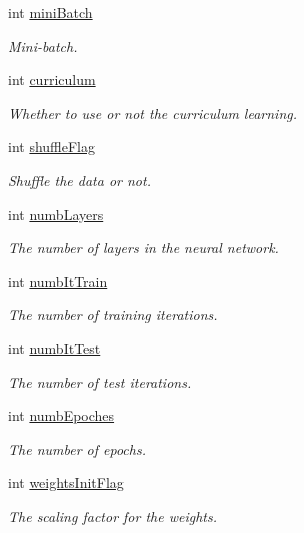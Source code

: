 \begin{DoxyCompactItemize}
int \hyperlink{classParamsInit_a5b75660e32158581daeb48a8b648c19a}{mini\+Batch}
\begin{DoxyCompactList}\small\item\em Mini-\/batch. \end{DoxyCompactList}\item 
int \hyperlink{classParamsInit_a7a7a2071cd2454eef8f2a1a0515cff0c}{curriculum}
\begin{DoxyCompactList}\small\item\em Whether to use or not the curriculum learning. \end{DoxyCompactList}\item 
int \hyperlink{classParamsInit_af816db821e4c8e19d599806617f11176}{shuffle\+Flag}
\begin{DoxyCompactList}\small\item\em Shuffle the data or not. \end{DoxyCompactList}\item 
int \hyperlink{classParamsInit_a290d2b18df1f4b1ceba37d2882ad2338}{numb\+Layers}
\begin{DoxyCompactList}\small\item\em The number of layers in the neural network. \end{DoxyCompactList}\item 
int \hyperlink{classParamsInit_aeddf1c385f0a769fffb6025335e6eb0b}{numb\+It\+Train}
\begin{DoxyCompactList}\small\item\em The number of training iterations. \end{DoxyCompactList}\item 
int \hyperlink{classParamsInit_af362ca101eef0ea95d5d63654f22f33b}{numb\+It\+Test}
\begin{DoxyCompactList}\small\item\em The number of test iterations. \end{DoxyCompactList}\item 
int \hyperlink{classParamsInit_a8b2c46d51b5b121b74e318423ef12343}{numb\+Epoches}
\begin{DoxyCompactList}\small\item\em The number of epochs. \end{DoxyCompactList}\item 
int \hyperlink{classParamsInit_a1ba43becf89da7f807f84f9bf6edf1a3}{weights\+Init\+Flag}
\begin{DoxyCompactList}\small\item\em The scaling factor for the weights. \end{DoxyCompactList}\item 

\end{DoxyCompactItemize}
